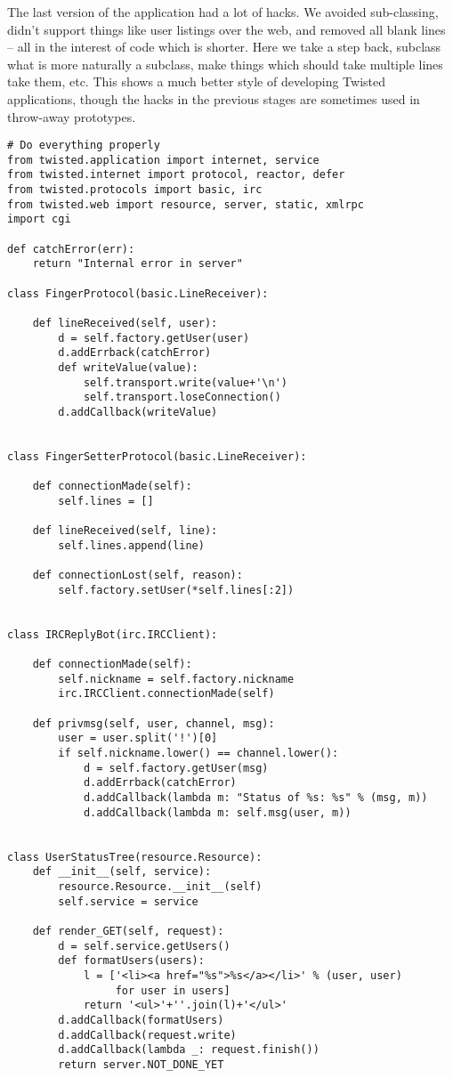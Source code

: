 The last version of the application had a lot of hacks. We avoided sub-classing, didn't support things like user listings over the web,  and removed all blank lines -- all in the interest of code which is shorter. Here we take a step back, subclass what is more naturally a subclass, make things which should take multiple lines take them, etc. This shows a much better style of developing Twisted applications, though the hacks in the previous stages are sometimes used in throw-away prototypes.\begin{verbatim}
# Do everything properly
from twisted.application import internet, service
from twisted.internet import protocol, reactor, defer
from twisted.protocols import basic, irc
from twisted.web import resource, server, static, xmlrpc
import cgi

def catchError(err):
    return "Internal error in server"

class FingerProtocol(basic.LineReceiver):

    def lineReceived(self, user):
        d = self.factory.getUser(user)
        d.addErrback(catchError)
        def writeValue(value):
            self.transport.write(value+'\n')
            self.transport.loseConnection()
        d.addCallback(writeValue)


class FingerSetterProtocol(basic.LineReceiver):

    def connectionMade(self):
        self.lines = []

    def lineReceived(self, line):
        self.lines.append(line)

    def connectionLost(self, reason):
        self.factory.setUser(*self.lines[:2])


class IRCReplyBot(irc.IRCClient):

    def connectionMade(self):
        self.nickname = self.factory.nickname
        irc.IRCClient.connectionMade(self)

    def privmsg(self, user, channel, msg):
        user = user.split('!')[0]
        if self.nickname.lower() == channel.lower():
            d = self.factory.getUser(msg)
            d.addErrback(catchError)
            d.addCallback(lambda m: "Status of %s: %s" % (msg, m))
            d.addCallback(lambda m: self.msg(user, m))


class UserStatusTree(resource.Resource):
    def __init__(self, service):
        resource.Resource.__init__(self)
        self.service = service

    def render_GET(self, request):
        d = self.service.getUsers()
        def formatUsers(users):
            l = ['<li><a href="%s">%s</a></li>' % (user, user)
                 for user in users]
            return '<ul>'+''.join(l)+'</ul>'
        d.addCallback(formatUsers)
        d.addCallback(request.write)
        d.addCallback(lambda _: request.finish())
        return server.NOT_DONE_YET


\end{verbatim}
